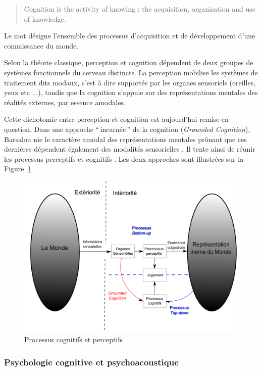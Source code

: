 \begin{quote}
Cognition is the activity of knowing : the acquisition, organisation and use of knowledge.
\end{quote}

Le mot désigne l'ensemble des processus d'acquisition et de développement d'une connaissance du monde. 


Selon la théorie classique, perception et cognition dépendent de deux groupes de systèmes fonctionnels du cerveau distincts. La perception mobilise les systèmes de traitement dits modaux, c'est à dire supportés par les organes sensoriels (oreilles, yeux etc $\ldots$), tandis que la cognition s'appuie sur des représentations mentales des réalités externes, par essence amodales.
 
Cette dichotomie entre perception et cognition est aujourd'hui remise en question. Dans une approche ``\,incarnée\,'' de la cognition (\emph{Grounded Cognition}), Barsalou nie le caractère amodal des représentations mentales prônant que ces dernières dépendent également des modalités sensorielles \citep{barsalou2010grounded}. Il tente ainsi de réunir les processus perceptifs et cognitifs \citep{goldstone1998reuniting, barsalou1999perceptions}.
Les deux approches sont illustrées sur la Figure~\ref{fig:processusPercepAndCo}.

\begin{figure}[bth]
        \myfloatalign
        \includegraphics[width=\linewidth]{gfx/Representation}
        \caption{Processus cognitifs et perceptifs}\label{fig:processusPercepAndCo}
\end{figure}

\subsubsection{Psychologie cognitive et psychoacoustique}

